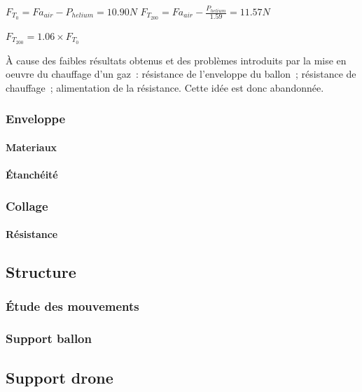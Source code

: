 \documentclass[a4paper,11pt]{article}
\begin{document}
\begin{center}
  $\displaystyle{F_{T_0} = Fa_{air} - P_{helium} = 10.90 N}$
  \bigbreak
  $\displaystyle{F_{T_{200}} = Fa_{air} - \frac{P_{helium}}{1.59} = 11.57 N}$ \\
\end{center}

$F_{T_{200}} = 1.06 \times F_{T_0}$

À cause des faibles résultats obtenus et des problèmes introduits par la mise en oeuvre du chauffage d'un gaz~: résistance de l'enveloppe du ballon~; résistance de chauffage~; alimentation de la résistance. Cette idée est donc abandonnée.

\subsubsection{Enveloppe}

\paragraph{Materiaux}

\paragraph{Étanchéité}

\subsubsection{Collage}

\paragraph{Résistance}

\subsection{Structure}

\subsubsection{Étude des mouvements}

\subsubsection{Support ballon}

\subsection{Support drone}
\end{document}
